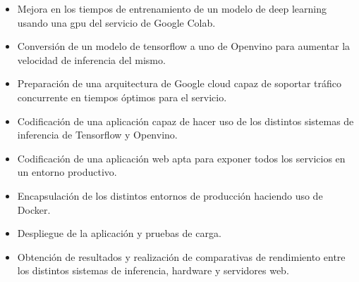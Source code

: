 \begin{itemize}
    \item Mejora en los tiempos de entrenamiento de un modelo de deep learning usando una gpu del servicio de Google Colab.
    \item Conversión de un modelo de tensorflow a uno de Openvino para aumentar la velocidad de inferencia del mismo.
    \item Preparación de una arquitectura de Google cloud capaz de soportar tráfico concurrente en tiempos óptimos para el servicio.
    \item Codificación de una aplicación capaz de hacer uso de los distintos sistemas de inferencia de Tensorflow y Openvino.
    \item Codificación de una aplicación web apta para exponer todos los servicios en un entorno productivo.
    \item Encapsulación de los distintos entornos de producción haciendo uso de Docker.
    \item Despliegue de la aplicación y pruebas de carga.
    \item Obtención de resultados y realización de comparativas de rendimiento entre los distintos sistemas de inferencia, hardware y servidores web.
\end{itemize}

